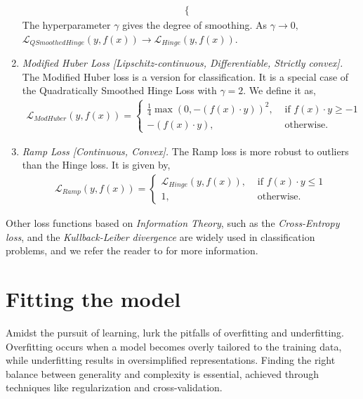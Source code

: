 \documentclass{article}
\begin{document}
\begin{enumerate}
\begin{equation}
\begin{split}
\begin{cases}
        \end{cases}
      \end{split}
    \end{equation}
    The hyperparameter $\gamma$ gives the degree of smoothing. As $\gamma \to 0,$  $\mathcal{L}_{QSmoothedHinge}(y, f(x)) \to \mathcal{L}_{Hinge}(y, f(x)) $.
    \item \textit{Modified Huber Loss [Lipschitz-continuous, Differentiable, Strictly convex].} The Modified Huber loss is a version for classification. It is a special case of the Quadratically Smoothed Hinge Loss with $\gamma =2$. We define it as,
\begin{equation}
      \begin{split}
        \mathcal{L}_{ModHuber}(y, f(x)) = 
        \begin{cases}
          \frac{1}{4} \max (0, -(f(x) \cdot y))^2 , &\text{ if } f(x)\cdot y \geq -1 \\
         -(f(x) \cdot y), &\text{ otherwise.}  
        \end{cases}
      \end{split}
    \end{equation}
    \item \textit{Ramp Loss [Continuous, Convex].} The Ramp loss is more robust to outliers than the Hinge loss. It is given by,
    \begin{equation}
      \begin{split}
        \mathcal{L}_{Ramp}(y, f(x)) = 
        \begin{cases}
         \mathcal{L}_{Hinge}(y, f(x)), &\text{ if } f(x)\cdot y \leq 1 \\
         1, &\text{ otherwise.}  
        \end{cases}
      \end{split}
    \end{equation}
  \end{enumerate}
Other loss functions based on \textit{Information Theory}, such as the \textit{Cross-Entropy loss}, and the \textit{Kullback-Leiber divergence} are widely used in classification problems, and we refer the reader to \citep{ciampiconi2023survey} for more information.
 \section{Fitting the model}\label{sec:fitting}

Amidst the pursuit of learning, lurk the pitfalls of overfitting and underfitting. Overfitting occurs when a model becomes overly tailored to the training data, while underfitting results in oversimplified representations. Finding the right balance between generality and complexity is essential, achieved through techniques like regularization and cross-validation.
\end{document}
